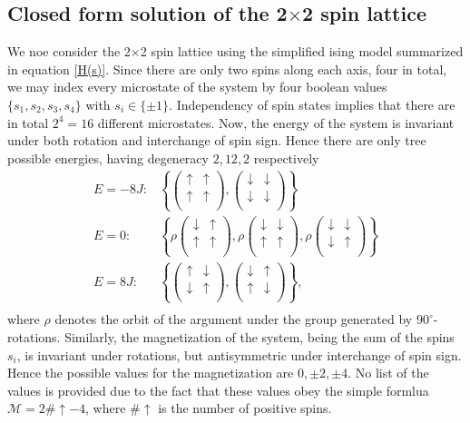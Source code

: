 \documentclass[twoside,utf8]{article}
\newcommand{\EQU}[1] { \begin{equation*} \begin{split} #1 \end{split} \end{equation*} }
\begin{document}
\subsection{Closed form solution of the 2$\times$2 spin lattice}
We noe consider the 2$\times$2 spin lattice using the simplified ising model summarized in equation \ref*{H(s)}. Since there are only two spins along each axis, four in total, we may index every microstate of the system by four boolean values $\{s_1,s_2,s_3,s_4\}$ with $s_i \in \{\pm 1\}$. Independency of spin states implies that there are in total $2^4=16$ different microstates. Now, the energy of the system is invariant under both rotation and interchange of spin sign. Hence there are only tree possible energies, having degeneracy $2,12,2$ respectively
\EQU{
E=-8J: & \left\{
\left(\begin{matrix}
\uparrow & \uparrow \\
\uparrow & \uparrow \\
\end{matrix}\right),
\left(\begin{matrix}
\downarrow & \downarrow \\
\downarrow & \downarrow \\
\end{matrix}\right)
\right\} \\
E = 0: &
\left\{
\rho\left(\begin{matrix}
\downarrow & \uparrow \\
\uparrow & \uparrow \\
\end{matrix}\right),
\rho\left(\begin{matrix}
\downarrow & \downarrow \\
\uparrow & \uparrow \\
\end{matrix}\right),
\rho\left(\begin{matrix}
\downarrow & \downarrow \\
\downarrow & \uparrow \\
\end{matrix}\right)
\right\} \\
E=8J: & \left\{
\left(\begin{matrix}
\uparrow & \downarrow \\
\downarrow & \uparrow \\
\end{matrix}\right),
\left(\begin{matrix}
\downarrow & \uparrow \\
\uparrow & \downarrow \\
\end{matrix}\right)
\right\}, \\
}
where $\rho$ denotes the orbit of the argument under the group generated by $90^\circ$-rotations. Similarly, the magnetization of the system, being the sum of the spins $s_i$, is invariant under rotations, but antisymmetric under interchange of spin sign. Hence the possible values for the magnetization are $0,\pm 2, \pm 4$. No list of the values is provided due to the fact that these values obey the simple formlua $\mathcal{M}=2\# \uparrow -4$, where $\#\uparrow$ is the number of positive spins.
\end{document}

